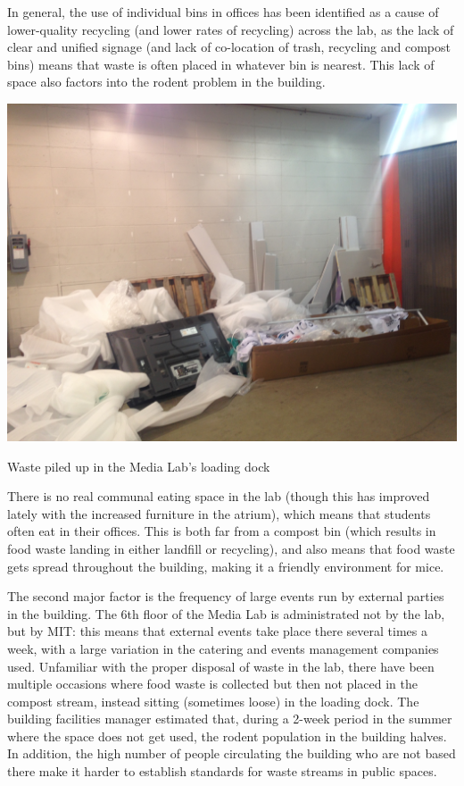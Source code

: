 \documentclass[nofonts,nols,justified,nobib]{tufte-book}
\begin{document}
In general, the use of individual bins in offices has been identified as a cause of lower-quality recycling (and lower rates of recycling) across the lab, as the lack of clear and unified signage (and lack of co-location of trash, recycling and compost bins) means that waste is often placed in whatever bin is nearest. This lack of space also factors into the rodent problem in the building. 
\begin{marginfigure}
  \includegraphics[width=1\linewidth]{img/2/mit-bins/loading6.JPG}
  \caption{Waste piled up in the Media Lab's loading dock}
\end{marginfigure}
There is no real communal eating space in the lab (though this has improved lately with the increased furniture in the atrium), which means that students often eat in their offices. This is both far from a compost bin (which results in food waste landing in either landfill or recycling), and also means that food waste gets spread throughout the building, making it a friendly environment for mice.

The second major factor is the frequency of large events run by external parties in the building. The 6th floor of the Media Lab is administrated not by the lab, but by MIT: this means that external events take place there several times a week, with a large variation in the catering and events management companies used. Unfamiliar with the proper disposal of waste in the lab, there have been multiple occasions where food waste is collected but then not placed in the compost stream, instead sitting (sometimes loose) in the loading dock. The building facilities manager estimated that, during a 2-week period in the summer where the space does not get used, the rodent population in the building halves. In addition, the high number of people circulating the building who are not based there make it harder to establish standards for waste streams in public spaces.
\end{document}
